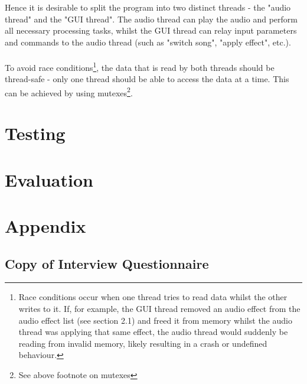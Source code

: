 \documentclass{article}
\begin{document}
	Hence it is desirable to split the program into two distinct threads - the "audio thread" and the "GUI thread". The audio thread can play the audio and perform all necessary processing tasks, whilst the GUI thread can relay input parameters and commands to the audio thread (such as "switch song", "apply effect", etc.).
	
	\paragraph{}
	To avoid race conditions\footnote{
		 Race conditions occur when one thread tries to read data whilst the other writes to it. If, for example, the GUI thread removed an audio effect from the audio effect list (see section 2.1) and freed it from memory whilst the audio thread was applying that same effect, the audio thread would suddenly be reading from invalid memory, likely resulting in a crash or undefined behaviour.
	}, the data that is read by both threads should be thread-safe - only one thread should be able to access the data at a time. This can be achieved by using mutexes\footnote{See above footnote on mutexes}.
	
	
	\pagebreak
	\section {  Testing }
	
	\pagebreak
	\section {  Evaluation }
	
	\pagebreak
	\section { Appendix  }
	
	\subsection{Copy of Interview Questionnaire}
	
\end{document}
